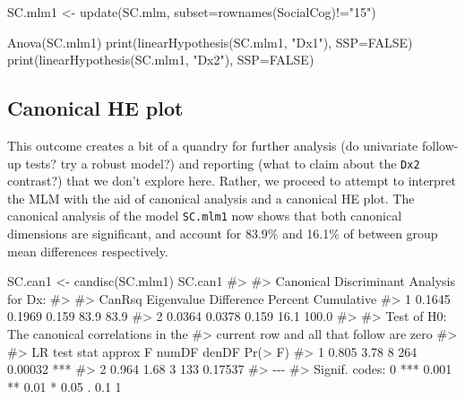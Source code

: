 \documentclass[
  letterpaper,
  10pt,
  krantz2]{krantz}
\makeatletter
\newenvironment{Shaded}{\begin{snugshade}}{\end{snugshade}}
\newcommand{\AttributeTok}[1]{\textcolor[rgb]{0.40,0.45,0.13}{#1}}
\newcommand{\CommentTok}[1]{\textcolor[rgb]{0.37,0.37,0.37}{#1}}
\newcommand{\ConstantTok}[1]{\textcolor[rgb]{0.56,0.35,0.01}{#1}}
\newcommand{\FunctionTok}[1]{\textcolor[rgb]{0.28,0.35,0.67}{#1}}
\newcommand{\NormalTok}[1]{\textcolor[rgb]{0.00,0.23,0.31}{#1}}
\newcommand{\OtherTok}[1]{\textcolor[rgb]{0.00,0.23,0.31}{#1}}
\newcommand{\SpecialCharTok}[1]{\textcolor[rgb]{0.37,0.37,0.37}{#1}}
\newcommand{\StringTok}[1]{\textcolor[rgb]{0.13,0.47,0.30}{#1}}
\newenvironment{kframe}{%
  \medskip{}
  \setlength{\fboxsep}{.8em}
  \def\at@end@of@kframe{}%
  \ifinner\ifhmode%
  \def\at@end@of@kframe{\end{minipage}}%
  \begin{minipage}{\columnwidth}%
  \fi\fi%
  \def\FrameCommand##1{\hskip\@totalleftmargin \hskip-\fboxsep
  \colorbox{shadecolor}{##1}\hskip-\fboxsep
      \hskip-\linewidth \hskip-\@totalleftmargin \hskip\columnwidth}%
  \MakeFramed {\advance\hsize-\width
    \@totalleftmargin\z@ \linewidth\hsize
    \@setminipage}}%
{\par\unskip\endMakeFramed%
  \at@end@of@kframe}
\renewenvironment{Shaded}{\begin{kframe}}{\end{kframe}}
\makeatother
\begin{document}
\begin{Shaded}
\begin{Highlighting}[]
\NormalTok{SC.mlm1 }\OtherTok{\textless{}{-}} \FunctionTok{update}\NormalTok{(SC.mlm, }
                  \AttributeTok{subset=}\FunctionTok{rownames}\NormalTok{(SocialCog)}\SpecialCharTok{!=}\StringTok{"15"}\NormalTok{)}

\FunctionTok{Anova}\NormalTok{(SC.mlm1)}
\FunctionTok{print}\NormalTok{(}\FunctionTok{linearHypothesis}\NormalTok{(SC.mlm1, }\StringTok{"Dx1"}\NormalTok{), }\AttributeTok{SSP=}\ConstantTok{FALSE}\NormalTok{)}
\FunctionTok{print}\NormalTok{(}\FunctionTok{linearHypothesis}\NormalTok{(SC.mlm1, }\StringTok{"Dx2"}\NormalTok{), }\AttributeTok{SSP=}\ConstantTok{FALSE}\NormalTok{)}
\end{Highlighting}
\end{Shaded}

\hypertarget{canonical-he-plot}{%
\subsection{Canonical HE plot}\label{canonical-he-plot}}

This outcome creates a bit of a quandry for further analysis (do
univariate follow-up tests? try a robust model?) and reporting (what to
claim about the \texttt{Dx2} contrast?) that we don't explore here.
Rather, we proceed to attempt to interpret the MLM with the aid of
canonical analysis and a canonical HE plot. The canonical analysis of
the model \texttt{SC.mlm1} now shows that both canonical dimensions are
significant, and account for 83.9\% and 16.1\% of between group mean
differences respectively.

\begin{Shaded}
\begin{Highlighting}[]
\NormalTok{SC.can1 }\OtherTok{\textless{}{-}} \FunctionTok{candisc}\NormalTok{(SC.mlm1)}
\NormalTok{SC.can1}
\CommentTok{\#\textgreater{} }
\CommentTok{\#\textgreater{} Canonical Discriminant Analysis for Dx:}
\CommentTok{\#\textgreater{} }
\CommentTok{\#\textgreater{}   CanRsq Eigenvalue Difference Percent Cumulative}
\CommentTok{\#\textgreater{} 1 0.1645     0.1969      0.159    83.9       83.9}
\CommentTok{\#\textgreater{} 2 0.0364     0.0378      0.159    16.1      100.0}
\CommentTok{\#\textgreater{} }
\CommentTok{\#\textgreater{} Test of H0: The canonical correlations in the }
\CommentTok{\#\textgreater{} current row and all that follow are zero}
\CommentTok{\#\textgreater{} }
\CommentTok{\#\textgreater{}   LR test stat approx F numDF denDF Pr(\textgreater{} F)    }
\CommentTok{\#\textgreater{} 1        0.805     3.78     8   264 0.00032 ***}
\CommentTok{\#\textgreater{} 2        0.964     1.68     3   133 0.17537    }
\CommentTok{\#\textgreater{} {-}{-}{-}}
\CommentTok{\#\textgreater{} Signif. codes:  0 \textquotesingle{}***\textquotesingle{} 0.001 \textquotesingle{}**\textquotesingle{} 0.01 \textquotesingle{}*\textquotesingle{} 0.05 \textquotesingle{}.\textquotesingle{} 0.1 \textquotesingle{} \textquotesingle{} 1}
\end{Highlighting}
\end{Shaded}
\end{document}
